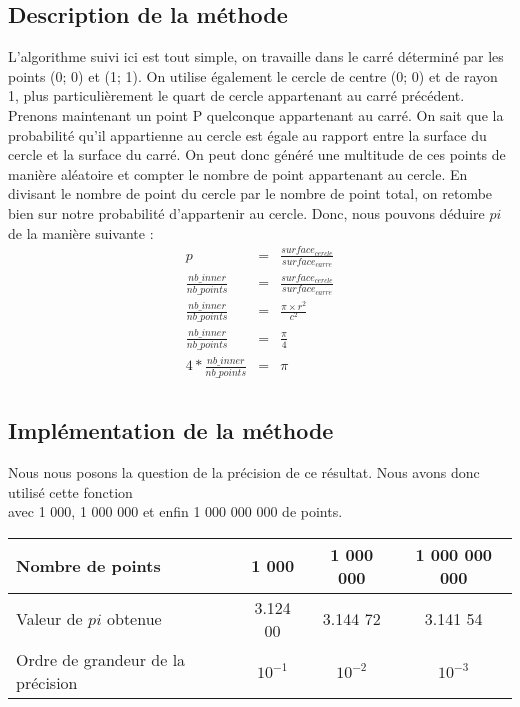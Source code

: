 \documentclass[a4paper]{article}
\begin{document}
\subsection{Description de la méthode}
L'algorithme suivi ici est tout simple, on travaille dans le carré déterminé par les points (0; 0) et (1; 1). 
On utilise également le cercle de centre (0; 0) et de rayon 1, plus particulièrement le quart de cercle appartenant au carré précédent.
Prenons maintenant un point P quelconque appartenant au carré. On sait que la probabilité qu'il appartienne au cercle est égale au rapport entre la surface du cercle et la surface du carré.
On peut donc généré une multitude de ces points de manière aléatoire et compter le nombre de point appartenant au cercle. En divisant le nombre de point du cercle par le nombre de point total, on retombe bien sur notre probabilité d'appartenir au cercle.
Donc, nous pouvons déduire $pi$ de la manière suivante :
\begin{eqnarray*}
	p &=& \frac{surface_{cercle}}{surface_{carre}} \\
	\frac{nb\_inner}{nb\_points}  &=& \frac{surface_{cercle}}{surface_{carre}} \\
	\frac{nb\_inner}{nb\_points}  &=& \frac{\pi \times r^2}{c^2} \\
	\frac{nb\_inner}{nb\_points}  &=& \frac{\pi}{4} \\
	4*\frac{nb\_inner}{nb\_points}  &=& \pi \\
\end{eqnarray*}

\subsection{Implémentation de la méthode}
\begin{mdframed}[backgroundcolor=light-gray, roundcorner=20pt,
	leftmargin=-45, rightmargin=-45, 
	innerleftmargin=20, innertopmargin=1, innerbottommargin=1, 
	outerlinewidth=1, linecolor=darkgray]
	
\end{mdframed}

Nous nous posons la question de la précision de ce résultat. Nous avons donc utilisé cette fonction\\ avec 1 000, 1 000 000 et enfin 1 000 000 000 de points.
\smallskip
\begin{center}
	\begin{tabular}{|l||c|c|c|}
		\hline
		Nombre de points & 1 000 & 1 000 000 & 1 000 000 000
		\\\hline
		Valeur de $pi$ obtenue & 3.124 00 & 3.144 72 & 3.141 54
		\\\hline
		Ordre de grandeur de la précision & $10^{-1}$ & $10^{-2}$ & $10^{-3}$
		\\\hline
	\end{tabular}
\end{center}
\end{document}
